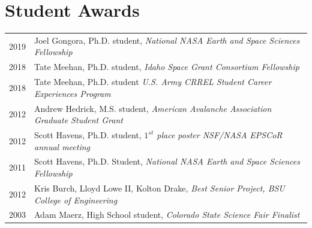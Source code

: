 \documentclass[11pt]{article}
\begin{document}
\begin{tabular}{ll}
\end{tabular}

\section*{Student Awards}
\begin{tabular}{ll}
2019 & Joel Gongora, Ph.D. student, \textit{National NASA Earth and Space Sciences Fellowship} \\
2018 & Tate Meehan, Ph.D. student, \textit{Idaho Space Grant Consortium Fellowship} \\
2018 & Tate Meehan, Ph.D. student \textit{U.S. Army CRREL Student Career Experiences Program} \\
2012 & Andrew Hedrick, M.S. student, \textit{American Avalanche Association Graduate Student Grant} \\
2012 & Scott Havens, Ph.D. student, \textit{$1^{st}$ place poster NSF/NASA EPSCoR annual meeting} \\
2011 & Scott Havens, Ph.D. Student, \textit{National NASA Earth and Space Sciences Fellowship} \\
2012 & Kris Burch, Lloyd Lowe II, Kolton Drake, \textit{Best Senior Project, BSU College of Engineering} \\
2003 & Adam Maerz, High School student, \textit{Colorado State Science Fair Finalist}
\end{tabular}

\end{document}
